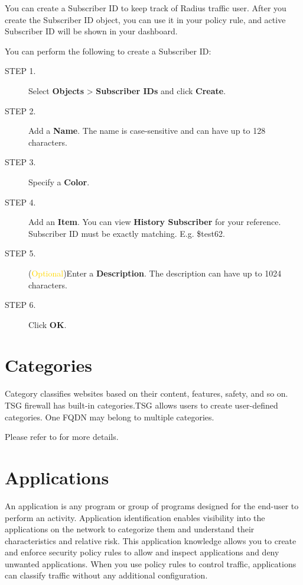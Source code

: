 You can create a Subscriber ID to keep track of Radius traffic user. After you create the Subscriber ID object, you can use it in your policy rule, and active Subscriber ID will be shown in your dashboard. 


You can perform the following to create a Subscriber ID:

\begin{description}
    \item[STEP 1.]	Select \textbf{Objects} > \textbf{Subscriber IDs} and click \textbf{Create}.
    \item[STEP 2.]	Add a \textbf{Name}. The name is case-sensitive and can have up to 128 characters.
    \item[STEP 3.]	Specify a \textbf{Color}.
    \item[STEP 4.]	Add an \textbf{Item}. You can view \textbf{History Subscriber} for your reference. Subscriber ID must be exactly matching. E.g. \$test62.
    \item[STEP 5.]	(\textcolor{gold}{Optional})Enter a \textbf{Description}. The description can have up to 1024 characters.
    \item[STEP 6.]	Click \textbf{OK}.
\end{description}

\section*{\hypertarget{link:Categories}{Categories}}
\label{sec:objects:category}

Category classifies websites based on their content, features, safety, and so on. TSG firewall has built-in categories.TSG allows users to create user-defined categories. One FQDN may belong to multiple categories.


Please refer to \hyperlink{link:Appendix A Built-in Category}{\color{linkblue}{Appendix A Built-in Category}} for more details.

\section*{\hypertarget{link:Applications}{Applications}}
\label{sec:objects:application}

An application is any program or group of programs designed for the end-user to perform an activity. Application identification enables visibility into the applications 
on the network to categorize them and understand their characteristics and relative risk. This application knowledge allows you to create and enforce security policy rules to 
allow and inspect applications and deny unwanted applications. When you use policy rules to control traffic, applications can classify traffic without any additional configuration.


